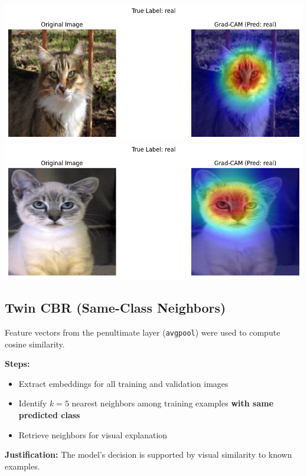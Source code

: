 \documentclass{article}
\begin{document}
\includegraphics[width=0.9\linewidth]{img/sample_real_1.png}\\
\includegraphics[width=0.9\linewidth]{img/sample_real_2.png}\\

\subsection{Twin CBR (Same-Class Neighbors)}
Feature vectors from the penultimate layer (\texttt{avgpool}) were used to compute cosine similarity.

\textbf{Steps:}
\begin{itemize}
    \item Extract embeddings for all training and validation images
    \item Identify $k=5$ nearest neighbors among training examples \textbf{with same predicted class}
    \item Retrieve neighbors for visual explanation
\end{itemize}

\textbf{Justification:} The model's decision is supported by visual similarity to known examples.\\
\end{document}
